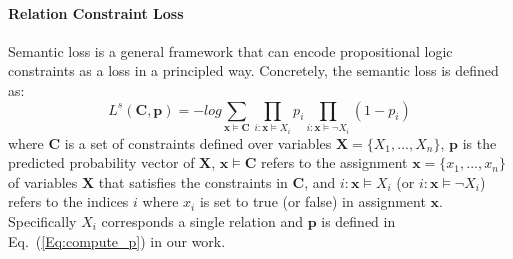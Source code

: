 \paragraph{Relation Constraint Loss}
Semantic loss is a general framework that can encode propositional logic constraints as a loss in a principled way.
Concretely, the semantic loss is defined as:
\begin{equation}
\label{seq:semantic_loss}
	L^{s}(\bm{C}, \bm{p}) = -log\sum\limits_{\bm x\models\bm{C}}\prod\limits_{i:\bm x\models X_i}p_i\prod\limits_{i:\bm x\models \neg X_i}(1-p_i)
\end{equation}
where $\bm{C}$ is a set of constraints defined over variables $\bm{X}=\{X_1,...,X_n\}$, 
$\bm{p}$ is the predicted probability vector of $\bm{X}$,
$\bm x \models \bm{C}$ refers to the assignment $\bm{x} = \{x_1,...,x_n\}$ of variables $\bm X$ that satisfies the constraints in $\bm{C}$,
and $i\colon\bm x \models X_i$ (or $i\colon\bm x\models \neg X_i$) refers to the indices $i$ where $x_i$ is set to true (or false) in assignment $\bm x$.
Specifically $X_i$ corresponds a single relation and $\bm{p}$ is defined in Eq.~(\ref{Eq:compute_p}) in our work.

